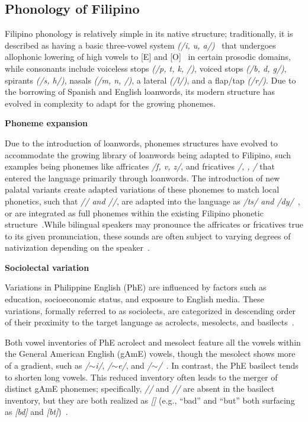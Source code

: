 \subsection{Phonology of Filipino}

Filipino phonology is relatively simple in its native structure;
traditionally, it is described as having a basic three-vowel system
\textit{(/i, u, a/)}~\cite{kaufman2010} that undergoes allophonic
lowering of high vowels to [E] and [O]~\cite{llamzon1966} in certain
prosodic domains, while consonants include voiceless stops \textit{(/p, t, k, /)},
voiced stops \textit{(/b, d, g/)}, spirants \textit{(/s, h/)}, nasals
\textit{(/m, n, /)}, a lateral \textit{(/l/)}, and a flap/tap
\textit{(/r/)}. Due to the borrowing of Spanish and English loanwords,
its modern structure has evolved in complexity to adapt for the growing 
phonemes.

\textbf{Phoneme expansion}

Due to the introduction of loanwords, phonemes structures have evolved
to accommodate the growing library of loanwords being adapted to Filipino,
such examples being phonemes like affricates \textit{/f, v, z/}, and fricatives 
\textit{/, , /} that entered the language 
primarily through loanwords. The introduction of new palatal variants create 
adapted variations of these phonemes to match local phonetics, such that 
\textit{// and //}, are adapted into the language as 
\textit{/ts/ and /dy/}~\cite{llamzon1966}, or are integrated as full phonemes 
within the existing Filipino phonetic structure~\cite{kaufman2010}.While bilingual 
speakers may pronounce the affricates or fricatives true to its given pronunciation, 
these sounds are often subject to varying degrees of nativization depending on the speaker~\cite{kaufman2010}. 

\textbf{Sociolectal variation}

Variations in Philippine English (PhE) are influenced by factors such as education, 
socioeconomic status, and exposure to English media. These variations, formally referred 
to as sociolects, are categorized in descending order of their proximity to the target 
language as acrolects, mesolects, and basilects~\cite{tayao2004}.

Both vowel inventories of PhE acrolect and mesolect feature all the vowels within the General 
American English (gAmE) vowels, 
though the mesolect shows more of a gradient, such as \textit{/$\sim$i/},
\textit{/$\sim$e/}, and \textit{/$\sim$\textipa{\ae}/}~\cite{magpale_segmental_2024}. 
In contrast, 
the PhE basilect tends to shorten long vowels. This reduced 
inventory often leads to the merger of distinct gAmE phonemes; specifically, 
\textit{/\textipa{\ae}/} and \textit{//} are absent in the basilect inventory, but
they are both 
realized as \textit{[]} (e.g., ``bad'' and ``but'' 
both surfacing as \textit{[bd]} and \textit{[bt]})~\cite{magpale_segmental_2024}.

